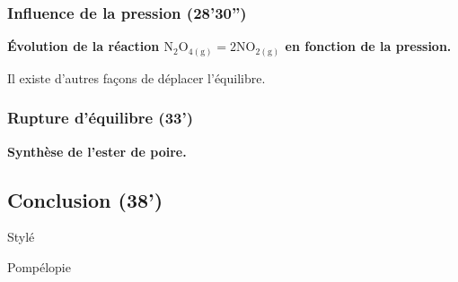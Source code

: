 \subsubsection{Influence de la pression (28'30'')}

\begin{experience}
\textbf{Évolution de la réaction $\mathrm{N_2O_{4(g)} = 2NO_{2(g)}}$ en fonction de la pression.}
\end{experience}

\begin{transition}
Il existe d'autres façons de déplacer l'équilibre.
\end{transition}

\subsubsection{Rupture d'équilibre (33')}

\begin{experience}
\textbf{Synthèse de l'ester de poire.}
\end{experience}

\subsection{Conclusion (38')}

\begin{slide}
Stylé
\end{slide}

\begin{remarque}
Pompélopie
\end{remarque}

